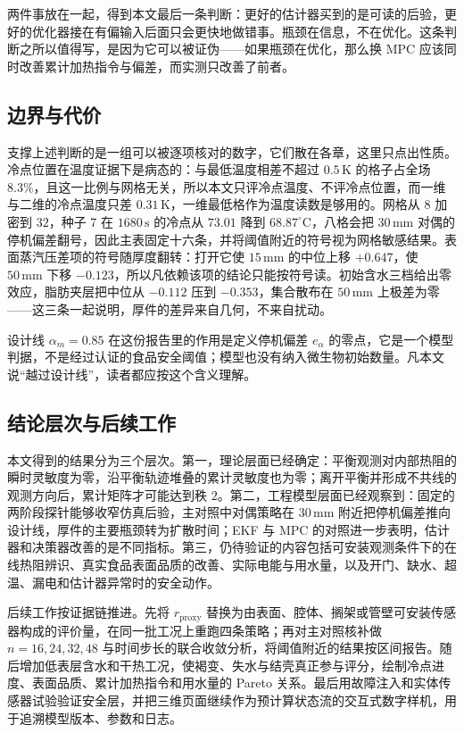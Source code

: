 两件事放在一起，得到本文最后一条判断：更好的估计器买到的是可读的后验，更好的优化器接在有偏输入后面只会更快地做错事。瓶颈在信息，不在优化。这条判断之所以值得写，是因为它可以被证伪——如果瓶颈在优化，那么换 MPC 应该同时改善累计加热指令与偏差，而实测只改善了前者。

\subsection{边界与代价}

支撑上述判断的是一组可以被逐项核对的数字，它们散在各章，这里只点出性质。冷点位置在温度证据下是病态的：与最低温度相差不超过 \(0.5\,\mathrm{K}\) 的格子占全场 \(8.3\%\)，且这一比例与网格无关，所以本文只评冷点温度、不评冷点位置，而一维与二维的冷点温度只差 \(0.31\,\mathrm{K}\)，一维最低格作为温度读数是够用的。网格从 \(8\) 加密到 \(32\)，种子 7 在 \(1680\,\mathrm{s}\) 的冷点从 \(73.01\) 降到 \(68.87^\circ\mathrm{C}\)，八格会把 \(30\,\mathrm{mm}\) 对偶的停机偏差翻号，因此主表固定十六条，并将阈值附近的符号视为网格敏感结果。表面蒸汽压差项的符号随厚度翻转：打开它使 \(15\,\mathrm{mm}\) 的中位上移 \(+0.647\)，使 \(50\,\mathrm{mm}\) 下移 \(-0.123\)，所以凡依赖该项的结论只能按符号读。初始含水三档给出零效应，脂肪夹层把中位从 \(-0.112\) 压到 \(-0.353\)，集合散布在 \(50\,\mathrm{mm}\) 上极差为零——这三条一起说明，厚件的差异来自几何，不来自扰动。

设计线 \(\alpha_m=0.85\) 在这份报告里的作用是定义停机偏差 \(e_{\alpha}\) 的零点，它是一个模型判据，不是经过认证的食品安全阈值；模型也没有纳入微生物初始数量。凡本文说“越过设计线”，读者都应按这个含义理解。

\subsection{结论层次与后续工作}

本文得到的结果分为三个层次。第一，理论层面已经确定：平衡观测对内部热阻的瞬时灵敏度为零，沿平衡轨迹堆叠的累计灵敏度也为零；离开平衡并形成不共线的观测方向后，累计矩阵才可能达到秩 \(2\)。第二，工程模型层面已经观察到：固定的两阶段探针能够收窄仿真后验，主对照中对偶策略在 \(30\,\mathrm{mm}\) 附近把停机偏差推向设计线，厚件的主要瓶颈转为扩散时间；EKF 与 MPC 的对照进一步表明，估计器和决策器改善的是不同指标。第三，仍待验证的内容包括可安装观测条件下的在线热阻辨识、真实食品表面品质的改善、实际电能与用水量，以及开门、缺水、超温、漏电和估计器异常时的安全动作。

后续工作按证据链推进。先将 \(r_{\mathrm{proxy}}\) 替换为由表面、腔体、搁架或管壁可安装传感器构成的评价量，在同一批工况上重跑四条策略；再对主对照核补做 \(n=16,24,32,48\) 与时间步长的联合收敛分析，将阈值附近的结果按区间报告。随后增加低表层含水和干热工况，使褐变、失水与结壳真正参与评分，绘制冷点进度、表面品质、累计加热指令和用水量的 Pareto 关系。最后用故障注入和实体传感器试验验证安全层，并把三维页面继续作为预计算状态流的交互式数字样机，用于追溯模型版本、参数和日志。

